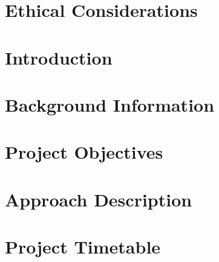 \documentclass[12pt]{article}
\begin{document}
\pagebreak

\section*{Ethical Considerations}


\pagebreak

\tableofcontents

\pagebreak


\section{Introduction}


\section{Background Information}


\section{Project Objectives}


\section{Approach Description}


\section{Project Timetable}



\newpage


\end{document}

